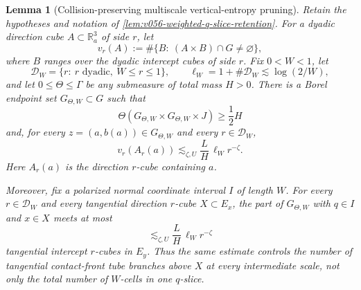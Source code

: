 \documentclass[10pt]{article}
\newtheorem{lemma}[theorem]{Lemma}
\begin{document}
\begin{lemma}[Collision-preserving multiscale vertical-entropy pruning]
\label{lem:v057-collision-preserving-multiscale-pruning}
Retain the hypotheses and notation of
\cref{lem:v056-weighted-q-slice-retention}.  For a dyadic direction cube
\(A\subset\mathbb R_a^3\) of side \(r\), let
\[
v_r(A)
:=
\#\{B:\ (A\times B)\cap G\ne\varnothing\},
\]
where \(B\) ranges over the dyadic intercept cubes of side \(r\).  Fix
\(0<W<1\), let
\[
\mathcal D_W
=
\{r:\ r\text{ dyadic},\ W\le r\le1\},
\qquad
\ell_W=1+\#\mathcal D_W\lesssim\log(2/W),
\]
and let \(0\le\Theta\le\Gamma\) be any submeasure of total mass
\(H>0\).  There is a Borel endpoint set \(G_{\Theta,W}\subset G\) such that
\begin{equation}
\label{eq:v057-collision-pruned-mass}
\boxed{
\Theta(G_{\Theta,W}\times G_{\Theta,W}\times J)
\ge
\frac12H
}
\end{equation}
and, for every \(z=(a,b(a))\in G_{\Theta,W}\) and every
\(r\in\mathcal D_W\),
\begin{equation}
\label{eq:v057-collision-pruned-branch}
\boxed{
v_r(A_r(a))
\lesssim_{\zeta,U}
\frac{L}{H}\,\ell_W r^{-\zeta}.
}
\end{equation}
Here \(A_r(a)\) is the direction \(r\)-cube containing \(a\).

Moreover, fix a polarized normal coordinate interval \(I\) of length \(W\).  For every
\(r\in\mathcal D_W\) and every tangential direction \(r\)-cube \(X\subset E_x\), the part of
\(G_{\Theta,W}\) with \(q\in I\) and \(x\in X\) meets at most
\begin{equation}
\label{eq:v057-tangential-branch-all-scales}
\boxed{
\lesssim_{\zeta,U}
\frac{L}{H}\,\ell_W r^{-\zeta}
}
\end{equation}
tangential intercept \(r\)-cubes in \(E_y\).  Thus the same estimate controls the number of
tangential contact-front tube branches above \(X\) at every intermediate scale, not only the total
number of \(W\)-cells in one \(q\)-slice.
\end{lemma}
\end{document}

